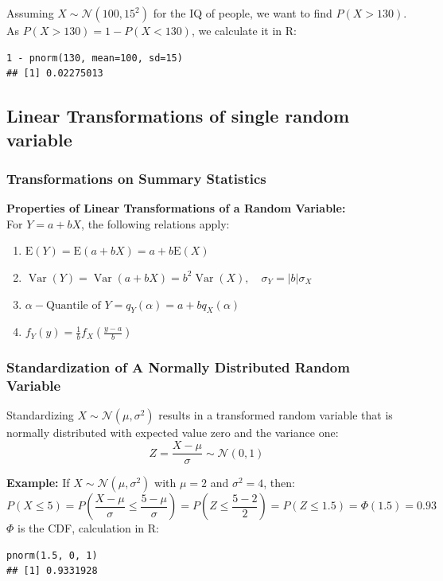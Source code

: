 \documentclass[11pt]{article}
\newcommand*\N[1]{\mathcal{N}\left(#1\right)}
\begin{document}
Assuming $X \sim \N{100, 15^2}$ for the IQ of people, we want to find $P(X > 130)$.
As $P(X > 130) = 1 - P(X < 130)$, we calculate it in R:
\begin{verbatim}
1 - pnorm(130, mean=100, sd=15)
## [1] 0.02275013
\end{verbatim}

\subsection{Linear Transformations of single random variable}

\subsubsection{Transformations on Summary Statistics}
\begin{definition}
	\textbf{Properties of Linear Transformations of a Random Variable:}\\
	For $Y=a+b X$, the following relations apply:
	\begin{enumerate}[label=(\roman*)]
		\item $\mathrm{E}(Y)=\mathrm{E}(a+b X)=a+b \mathrm{E}(X)$
		\item $\operatorname{Var}(Y)=\operatorname{Var}(a+b X)=b^2 \operatorname{Var}(X), \quad \sigma_Y=|b| \sigma_X$
		\item $\alpha - \text{Quantile of } Y=q_Y(\alpha)=a+b q_X(\alpha)$
		\item $f_Y(y)=\frac{1}{b} f_X\left(\frac{y-a}{b}\right)$
	\end{enumerate}
\end{definition}

\subsubsection{Standardization of A Normally Distributed Random Variable}
\begin{definition}
	Standardizing $ X\sim\N{\mu,\sigma^2} $ results in a transformed random variable that is normally distributed with expected value zero and the variance one:
	\begin{equation*}
		Z = \frac{X - \mu}{\sigma} \sim \N{0,1}
	\end{equation*}
\end{definition}

\textbf{Example:} If $X \sim \mathcal{N}\left(\mu, \sigma^2\right)$ with $\mu=2$ and $\sigma^2=4$, then:
\begin{equation*}
	P(X \leq 5)=P\left(\frac{X-\mu}{\sigma} \leq \frac{5-\mu}{\sigma}\right)=P\left(Z \leq \frac{5-2}{2}\right)=P(Z \leq 1.5)=\Phi(1.5)=0.93
\end{equation*}
$\Phi$ is the CDF, calculation in R: 
\begin{verbatim}
pnorm(1.5, 0, 1)
## [1] 0.9331928
\end{verbatim}
\end{document}
